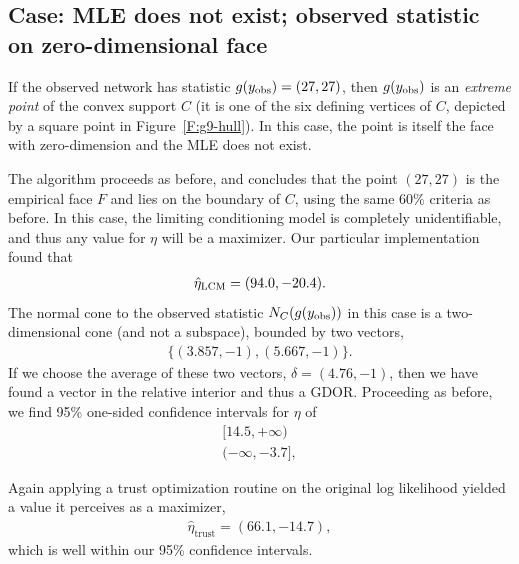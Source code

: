 \subsection{Case: MLE does not exist; observed statistic on zero-dimensional face}
If the observed network has statistic $g(y_{\textrm{obs}}) = (27, 27)$,  then 
$g(y_{\textrm{obs}})$ is an \emph{extreme point} 
of the convex support $C$ (it is one of the six defining vertices of $C$, depicted by
a square point in Figure~\ref{F:g9-hull}).  In this case, the point is itself the 
face with zero-dimension and the MLE does not exist.  

The algorithm proceeds as before, and concludes that the 
point $(27,27)$ is the empirical face $F$ and lies on the boundary of $C$, using the
same 60\% criteria as before.
In this case, the limiting conditioning model is completely unidentifiable, and thus 
any value for $\eta$ will be a maximizer.  Our particular implementation found that
\begin{align*}
	\hat{\eta}_{\textrm{LCM}} = (94.0, -20.4 ).
\end{align*}
The normal cone to the observed statistic $N_C (g(y_{\textrm{obs}}) )$ in this case is a two-dimensional cone (and not a subspace), bounded by 
two vectors,
\begin{align*}
	 \{ (3.857,   -1),	(5.667,   -1) \}.
\end{align*}
If we choose the average of these two vectors, $\delta = (4.76, -1)$, then we have 
found a vector in the relative interior and thus a GDOR.
Proceeding as before, we find 95\% one-sided confidence intervals for $\eta$ of 
\begin{align*}
	[14.5, +\infty)\\
	(-\infty, -3.7],
\end{align*}


Again applying a trust optimization routine on the original log 
likelihood yielded a value it perceives as a maximizer,  
\begin{align*}
 	\hat{\eta}_{\textrm{trust}} = (66.1, -14.7),
 \end{align*}
which is well within our 95\% confidence intervals.
  


